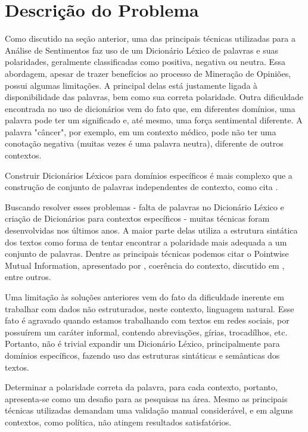 \documentclass[a4paper,11pt]{article}
\begin{document}
\section{Descrição do Problema}
Como discutido na seção anterior, uma das principais técnicas utilizadas para a Análise de Sentimentos faz uso de um Dicionário Léxico de palavras e suas polaridades, geralmente classificadas como positiva, negativa ou neutra. Essa abordagem, apesar de trazer benefícios ao processo de Mineração de Opiniões, possui algumas limitações. A principal delas está justamente ligada à disponibilidade das palavras, bem como sua correta polaridade. Outra dificuldade encontrada no uso de dicionários vem do fato que, em diferentes domínios, uma palavra pode ter um significado e, até mesmo, uma força sentimental diferente. A palavra "câncer", por exemplo, em um contexto médico, pode não ter uma conotação negativa (muitas vezes é uma palavra neutra), diferente de outros contextos.

Construir Dicionários Léxicos para domínios específicos é mais complexo que a construção de conjunto de palavras independentes de contexto, como cita \cite{Kanayama2006}.

Buscando resolver esses problemas - falta de palavras no Dicionário Léxico e criação de Dicionários para contextos específicos - muitas técnicas foram desenvolvidas nos últimos anos. A maior parte delas utiliza a estrutura sintática dos textos como forma de tentar encontrar a polaridade mais adequada a um conjunto de palavras. Dentre as principais técnicas podemos citar o Pointwise Mutual Information, apresentado por \cite{Turney2002}, coerência do contexto, discutido em \cite{Kanayama2006}, entre outros.

Uma limitação às soluções anteriores vem do fato da dificuldade inerente em trabalhar com dados não estruturados, neste contexto, linguagem natural. Esse fato é agravado quando estamos trabalhando com textos em redes sociais, por possuírem um caráter informal, contendo abreviações, gírias, trocadílhos, etc. Portanto, não é trivial expandir um Dicionário Léxico, principalmente para domínios específicos, fazendo uso das estruturas sintáticas e semânticas dos textos.

Determinar a polaridade correta da palavra, para cada contexto, portanto, apresenta-se como um desafio para as pesquisas na área. Mesmo as principais técnicas utilizadas demandam uma validação manual considerável, e em alguns contextos, como política, não atingem resultados satisfatórios.
\end{document}
